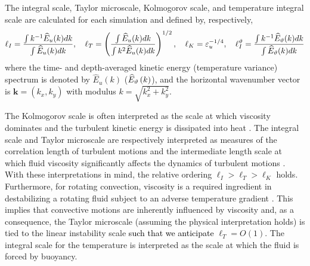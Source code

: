 The integral scale, Taylor microscale, Kolmogorov scale, and temperature integral scale are calculated for each simulation and defined by, respectively,
\begin{equation}	
\ell_I=\frac{\int k^{-1} \widehat{E}_{u}(k) dk}{\int \widehat{E}_{u}(k) dk}, \quad 
\ell_{T} = \left ( \frac{  \int \widehat{E}_{u}(k) dk}{\int k^2  \widehat{E}_{u}(k) dk} \right )^{1/2} , \quad
\ell_K = \varepsilon_u^{-1/4}, \quad
\ell_I^{\vartheta}=\frac{\int k^{-1} \widehat{E}_{\vartheta}(k) dk}{\int \widehat{E}_{\vartheta}(k) dk} 
\label{eqn:scales}
\end{equation}
where the time- and depth-averaged kinetic energy (temperature variance) spectrum is denoted by $\widehat{E}_u(k)$ ($\widehat{E}_{\vartheta}\left ( k \right )$), and the horizontal wavenumber vector is $\mathbf{k} = (k_x, k_y)$ with modulus $k = \sqrt{k_x^2 + k_y^2}$. 

The Kolmogorov scale is often interpreted as the scale at which viscosity dominates and the turbulent kinetic energy is dissipated into heat \textcolor{black}{\citep{gV06}}. 
The integral scale and Taylor microscale are respectively interpreted as measures of the correlation length of turbulent motions and the intermediate length scale at which fluid viscosity significantly affects the dynamics of turbulent motions \textcolor{black}{\citep{sP00}}. 
With these interpretations in mind, the relative ordering $\ell_I > \ell_T> \ell_K$ holds.
Furthermore, for rotating convection, viscosity is a required ingredient in destabilizing a rotating fluid subject to an adverse temperature gradient \citep{sC61}. 
This implies that convective motions are inherently influenced by viscosity and, as a consequence, the Taylor microscale (assuming the physical interpretation holds) is tied to the linear instability scale \textcolor{black}{such that we anticipate} $\ell_{T} = O(1)$. The integral scale for the temperature is interpreted as the scale at which the fluid is forced by buoyancy.




